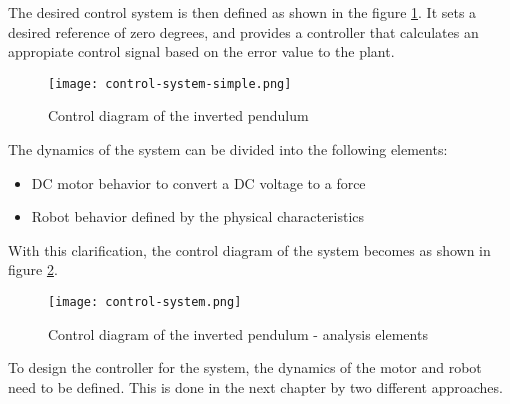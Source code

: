 The desired control system is then defined as shown in the figure \ref{fig:condiag}. It sets a desired reference of zero degrees, and provides a controller that calculates an appropiate control signal based on the error value to the plant.

\begin{figure}[h]
	\centering
	\texttt{[image: control-system-simple.png]}
	\caption{Control diagram of the inverted pendulum}\label{fig:condiag}
\end{figure}

The dynamics of the system can be divided into the following elements:
\begin{itemize}
	\item DC motor behavior to convert a DC voltage to a force
	\item Robot behavior defined by the physical characteristics
\end{itemize}

With this clarification, the control diagram of the system becomes as shown in figure \ref{fig:condiag2}.

\begin{figure}[h]
	\centering
	\texttt{[image: control-system.png]}
	\caption{Control diagram of the inverted pendulum - analysis elements}\label{fig:condiag2}
\end{figure}

To design the controller for the system, the dynamics of the motor and robot need to be defined. This is done in the next chapter by two different approaches.
